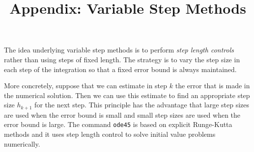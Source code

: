 \documentclass{ximera}
\title{Appendix: Variable Step Methods}
\begin{document}
\begin{abstract}
\end{abstract}
\maketitle


\label{sec:appslc}

The idea underlying variable step methods is to perform {\em step 
length controls\/} rather than using steps of 
fixed length.   The strategy is to vary the step size in each step of the 
integration so that a fixed error bound is always maintained.   

More concretely, suppose that we can estimate in step $k$ the error that is
made in the numerical solution.  Then we can use this estimate to find
an appropriate step size $h_{k+1}$ for the next step.  This principle has
the advantage that large step sizes are used when the error bound
is small and small step sizes are used when the error bound is large.
The \Matlab command {\tt ode45}
is based on explicit Runge-Kutta methods and it uses step length 
control to solve initial value problems 
numerically.
\end{document}
